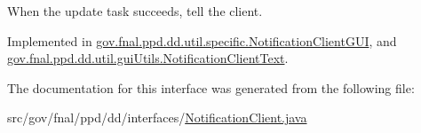 When the update task succeeds, tell the client. 



Implemented in \hyperlink{classgov_1_1fnal_1_1ppd_1_1dd_1_1util_1_1specific_1_1NotificationClientGUI_a4b11dc1662b8cd3e6b4816a60adc2000}{gov.\-fnal.\-ppd.\-dd.\-util.\-specific.\-Notification\-Client\-G\-U\-I}, and \hyperlink{classgov_1_1fnal_1_1ppd_1_1dd_1_1util_1_1guiUtils_1_1NotificationClientText_a8de8c375474d901a6554bd3c39d4cf46}{gov.\-fnal.\-ppd.\-dd.\-util.\-gui\-Utils.\-Notification\-Client\-Text}.



The documentation for this interface was generated from the following file\-:\begin{DoxyCompactItemize}
\item 
src/gov/fnal/ppd/dd/interfaces/\hyperlink{NotificationClient_8java}{Notification\-Client.\-java}\end{DoxyCompactItemize}
